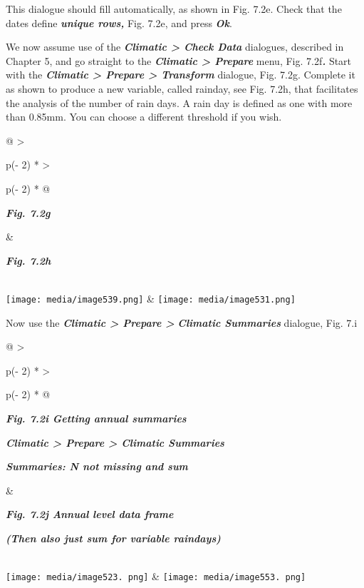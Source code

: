 \documentclass[
  letterpaper,
  DIV=11,
  numbers=noendperiod]{scrreprt}
\begin{document}
This dialogue should fill automatically, as shown in Fig. 7.2e. Check
that the dates define \textbf{\emph{unique rows,}} Fig. 7.2e, and press
\textbf{\emph{Ok}}.

We now assume use of the \textbf{\emph{Climatic \textgreater{} Check
Data}} dialogues, described in Chapter 5, and go straight to the
\textbf{\emph{Climatic \textgreater{} Prepare}} menu, Fig.
7.2f\textbf{\emph{.}} Start with the \textbf{\emph{Climatic
\textgreater{} Prepare \textgreater{} Transform}} dialogue, Fig. 7.2g.
Complete it as shown to produce a new variable, called rainday, see Fig.
7.2h, that facilitates the analysis of the number of rain days. A rain
day is defined as one with more than 0.85mm. You can choose a different
threshold if you wish.

\begin{longtable}[]{@{}
  >{\raggedright\arraybackslash}p{(\columnwidth - 2\tabcolsep) * }
  >{\raggedright\arraybackslash}p{(\columnwidth - 2\tabcolsep) * }@{}}
\toprule\noalign{}
\begin{minipage}[b]{\linewidth}\raggedright
\textbf{\emph{Fig. 7.2g}}
\end{minipage} & \begin{minipage}[b]{\linewidth}\raggedright
\textbf{\emph{Fig. 7.2h}}
\end{minipage} \\
\midrule\noalign{}
\endhead
\bottomrule\noalign{}
\endlastfoot
\texttt{[image: media/image539.png]} &
\texttt{[image: media/image531.png]} \\
\end{longtable}

Now use the \textbf{\emph{Climatic \textgreater{} Prepare
\textgreater{}}} \textbf{\emph{Climatic Summaries}} dialogue, Fig. 7.i

\begin{longtable}[]{@{}
  >{\raggedright\arraybackslash}p{(\columnwidth - 2\tabcolsep) * }
  >{\raggedright\arraybackslash}p{(\columnwidth - 2\tabcolsep) * }@{}}
\toprule\noalign{}
\begin{minipage}[b]{\linewidth}\raggedright
\textbf{\emph{Fig. 7.2i Getting annual summaries}}

\textbf{\emph{Climatic \textgreater{} Prepare \textgreater{} Climatic
Summaries}}

\textbf{\emph{Summaries: N not missing and sum}}
\end{minipage} & \begin{minipage}[b]{\linewidth}\raggedright
\textbf{\emph{Fig. 7.2j Annual level data frame}}

\textbf{\emph{(Then also just sum for variable raindays)}}
\end{minipage} \\
\midrule\noalign{}
\endhead
\bottomrule\noalign{}
\endlastfoot
\texttt{[image: media/image523. png]}
&
\texttt{[image: media/image553. png]} \\
\end{longtable}
\end{document}
